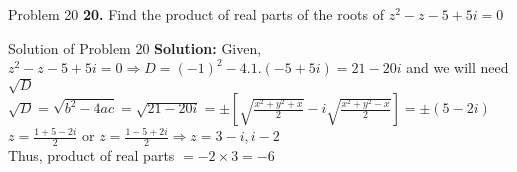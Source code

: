 \documentclass[aspectratio=169,8pt]{beamer}
\begin{document}
\begin{frame}{Problem 20}
  \textbf{20.} Find the product of real parts of the roots of $z^2 - z - 5 + 5i = 0$
\end{frame}
\begin{frame}{Solution of Problem 20}
  \textbf{Solution:} Given, $z^2 - z - 5 + 5i = 0 \Rightarrow D = (-1)^2 - 4.1.(-5 + 5i) = 21 - 20i$ and we will need $\sqrt{D}$\\
  \vspace*{0.2cm}
  $\sqrt{D} = \sqrt{b^2 - 4ac} = \sqrt{21 - 20i} = \pm \left[\sqrt{\frac{x^2 + y^2 + x}{2}} - i\sqrt{\frac{x^2 + y^2 - x}{2}}\right] = \pm(5 - 2i)$\\
  \vspace*{0.2cm}
  $z = \frac{1 + 5 - 2i}{2}$ or $z = \frac{1 - 5 + 2i}{2}\Rightarrow z = 3 - i, i - 2$\\
  \vspace*{0.2cm}
  Thus, product of real parts $= -2\times 3 = -6$
\end{frame}
\end{document}
